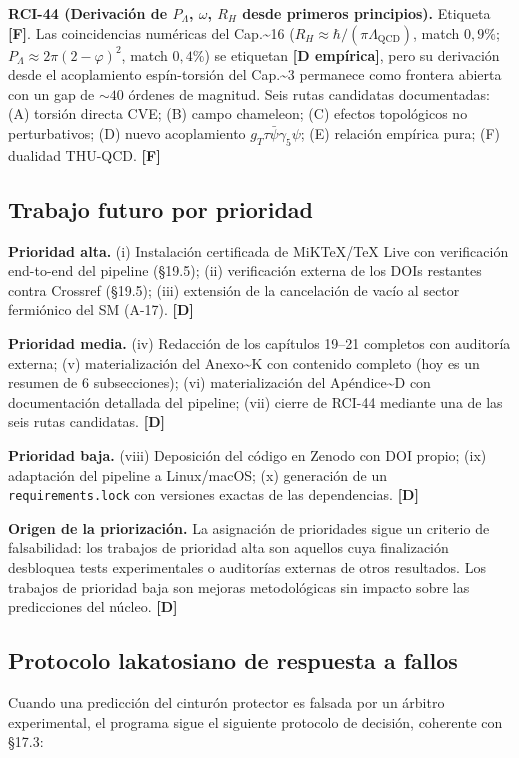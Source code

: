 ﻿\documentclass[11pt,letterpaper]{article}
\begin{document}
\textbf{RCI-44 (Derivación de $P_\Lambda$, $\omega$, $R_H$ desde primeros principios).} Etiqueta \textbf{[F]}. Las coincidencias numéricas del Cap.\textasciitilde{}16 ($R_H \approx \hbar/(\pi\Lambda_{\text{QCD}})$, match $0{,}9\%$; $P_\Lambda \approx 2\pi(2-\varphi)^2$, match $0{,}4\%$) se etiquetan \textbf{[D empírica]}, pero su derivación desde el acoplamiento espín-torsión del Cap.\textasciitilde{}3 permanece como frontera abierta con un gap de $\sim 40$ órdenes de magnitud. Seis rutas candidatas documentadas: (A) torsión directa CVE; (B) campo chameleon; (C) efectos topológicos no perturbativos; (D) nuevo acoplamiento $g_T \tau\bar{\psi}\gamma_5\psi$; (E) relación empírica pura; (F) dualidad THU-QCD. \textbf{[F]}
\subsection{Trabajo futuro por prioridad}
\textbf{Prioridad alta.} (i) Instalación certificada de MiKTeX/TeX Live con verificación end-to-end del pipeline (§19.5); (ii) verificación externa de los DOIs restantes contra Crossref (§19.5); (iii) extensión de la cancelación de vacío al sector fermiónico del SM (A-17). \textbf{[D]}

\textbf{Prioridad media.} (iv) Redacción de los capítulos 19--21 completos con auditoría externa; (v) materialización del Anexo\textasciitilde{}K con contenido completo (hoy es un resumen de 6 subsecciones); (vi) materialización del Apéndice\textasciitilde{}D con documentación detallada del pipeline; (vii) cierre de RCI-44 mediante una de las seis rutas candidatas. \textbf{[D]}

\textbf{Prioridad baja.} (viii) Deposición del código en Zenodo con DOI propio; (ix) adaptación del pipeline a Linux/macOS; (x) generación de un \texttt{requirements.lock} con versiones exactas de las dependencias. \textbf{[D]}

\textbf{Origen de la priorización.} La asignación de prioridades sigue un criterio de falsabilidad: los trabajos de prioridad alta son aquellos cuya finalización desbloquea tests experimentales o auditorías externas de otros resultados. Los trabajos de prioridad baja son mejoras metodológicas sin impacto sobre las predicciones del núcleo. \textbf{[D]}
\subsection{Protocolo lakatosiano de respuesta a fallos}
Cuando una predicción del cinturón protector es falsada por un árbitro experimental, el programa sigue el siguiente protocolo de decisión, coherente con §17.3:
\end{document}
